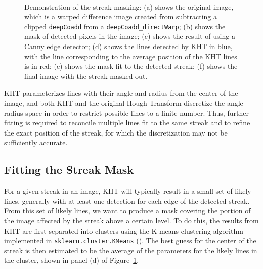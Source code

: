 \documentclass[DM,authoryear,toc]{lsstdoc}
\begin{document}
\begin{figure}
\qquad
{}  \\
\caption{Demonstration of the streak masking: (a) shows the original image, which is a warped difference image created from subtracting a clipped \texttt{deepCoadd} from a \texttt{deepCoadd\_directWarp}; (b) shows the mask of detected pixels in the image; (c) shows the result of using a Canny edge detector; (d) shows the lines detected by KHT in blue, with the line corresponding to the average position of the KHT lines is in red; (e) shows the mask fit to the detected streak; (f) shows the final image with the streak masked out.}
\label{fig: algo steps}
\end{figure}

KHT parameterizes lines with their angle and radius from the center of the image, and both KHT and the original Hough Transform discretize the angle-radius space in order to restrict possible lines to a finite number. Thus, further fitting is required to reconcile multiple lines fit to the same streak and to refine the exact position of the streak, for which the discretization may not be sufficiently accurate.


\subsection{Fitting the Streak Mask}
\label{sec: line fitting}

For a given streak in an image, KHT will typically result in a small set of likely lines, generally with at least one detection for each edge of the detected streak. From this set of likely lines, we want to produce a mask covering the portion of the image affected by the streak above a certain level. To do this, the results from KHT are first separated into clusters using the K-means clustering algorithm implemented in \texttt{sklearn.cluster.KMeans} (\citealt{Pedregosa:2011}). The best guess for the center of the streak is then estimated to be the average of the parameters for the likely lines in the cluster, shown in panel (d) of Figure~\ref{fig: algo steps}.
\end{document}
